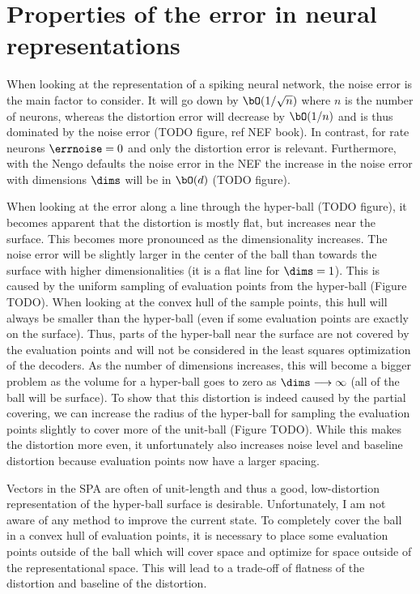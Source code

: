 \section{Properties of the error in neural representations}
When looking at the representation of a spiking neural network, the noise error is the main factor to consider.
It will go down by $\bO(1/\sqrt{n})$ where $n$ is the number of neurons, whereas the distortion error will decrease by $\bO(1/n)$ and is thus dominated by the noise error (TODO figure, ref NEF book).
In contrast, for rate neurons $\errnoise = 0$ and only the distortion error is relevant.
Furthermore, with the Nengo defaults the noise error in the NEF the increase in the noise error with dimensions $\dims$ will be in $\bO(d)$ (TODO figure).

When looking at the error along a line through the hyper-ball (TODO figure), it becomes apparent that the distortion is mostly flat, but increases near the surface.
This becomes more pronounced as the dimensionality increases.
The noise error will be slightly larger in the center of the ball than towards the surface with higher dimensionalities (it is a flat line for $\dims = 1$).
This is caused by the uniform sampling of evaluation points from the hyper-ball (Figure TODO).
When looking at the convex hull of the sample points, this hull will always be smaller than the hyper-ball (even if some evaluation points are exactly on the surface).
Thus, parts of the hyper-ball near the surface are not covered by the evaluation points and will not be considered in the least squares optimization of the decoders.
As the number of dimensions increases, this will become a bigger problem as the volume for a hyper-ball goes to zero as $\dims \longrightarrow \infty$ (all of the ball will be surface).
To show that this distortion is indeed caused by the partial covering, we can increase the radius of the hyper-ball for sampling the evaluation points slightly to cover more of the unit-ball (Figure TODO).
While this makes the distortion more even, it unfortunately also increases noise level and baseline distortion because evaluation points now have a larger spacing.

Vectors in the SPA are often of unit-length and thus a good, low-distortion representation of the hyper-ball surface is desirable.
Unfortunately, I am not aware of any method to improve the current state.
To completely cover the ball in a convex hull of evaluation points, it is necessary to place some evaluation points outside of the ball which will cover space and optimize for space outside of the representational space.
This will lead to a trade-off of flatness of the distortion and baseline of the distortion.


